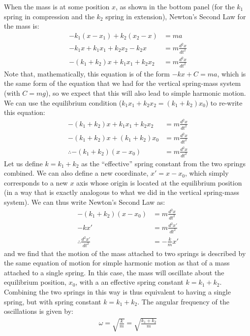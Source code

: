 When the mass is at some position $x$, as shown in the bottom panel (for the $k_1$ spring in compression and the $k_2$ spring in extension), Newton's Second Law for the mass is:
\begin{align*}
-k_1(x-x_1) + k_2 (x_2 - x) &= m a \\
-k_1x +k_1x_1 + k_2 x_2 - k_2 x &= m \frac{d^2x}{dt^2}\\
-(k_1+k_2)x  + k_1x_1 + k_2 x_2&= m \frac{d^2x}{dt^2}
\end{align*} 
Note that, mathematically, this equation is of the form $-kx + C =ma$, which is the same form of the equation that we had for the vertical spring-mass system (with $C=mg$), so we expect that this will also lead to simple harmonic motion. We can use the equilibrium condition ($k_1x_1+k_2x_2 =(k_1+k_2)x_0$) to re-write this equation:
\begin{align*}
-(k_1+k_2)x  + k_1x_1 + k_2 x_2&= m \frac{d^2x}{dt^2}\\
-(k_1+k_2)x  + (k_1+k_2)x_0&= m \frac{d^2x}{dt^2}\\
\therefore -(k_1+k_2) (x-x_0) &= m \frac{d^2x}{dt^2}
\end{align*} 
Let us define $k=k_1+k_2$ as the ``effective'' spring constant from the two springs combined. We can also define a new coordinate, $x' = x-x_0$, which simply corresponds to a new $x$ axis whose origin is located at the equilibrium position (in a way that is exactly analogous to what we did in the vertical spring-mass system). We can thus write Newton's Second Law as:
\begin{align*}
-(k_1+k_2) (x-x_0) &= m \frac{d^2x}{dt^2}\\
 -kx' &= m \frac{d^2x'}{dt^2}\\
 \therefore \frac{d^2x'}{dt^2} &= -\frac{k}{m}x'
\end{align*}
and we find that the motion of the mass attached to two springs is described by the same equation of motion for simple harmonic motion as that of a mass attached to a single spring. In this case, the mass will oscillate about the equilibrium position, $x_0$, with a an effective spring constant $k=k_1+k_2$. Combining the two springs in this way is thus equivalent to having a single spring, but with spring constant $k=k_1+k_2$. The angular frequency of the oscillations is given by:
\begin{align*}
\omega = \sqrt{\frac{k}{m}}=\sqrt{\frac{k_1+k_2}{m}}
\end{align*}

